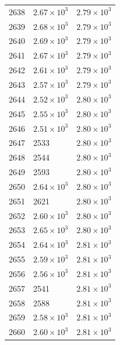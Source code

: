 \begin{table}[H]
\begin{tabular}{lll}
2638 & $\displaystyle 2.67 \times 10^{3}$ & $\displaystyle 2.79 \times 10^{3}$ \\
2639 & $\displaystyle 2.68 \times 10^{3}$ & $\displaystyle 2.79 \times 10^{3}$ \\
2640 & $\displaystyle 2.69 \times 10^{3}$ & $\displaystyle 2.79 \times 10^{3}$ \\
2641 & $\displaystyle 2.67 \times 10^{3}$ & $\displaystyle 2.79 \times 10^{3}$ \\
2642 & $\displaystyle 2.61 \times 10^{3}$ & $\displaystyle 2.79 \times 10^{3}$ \\
2643 & $\displaystyle 2.57 \times 10^{3}$ & $\displaystyle 2.79 \times 10^{3}$ \\
2644 & $\displaystyle 2.52 \times 10^{3}$ & $\displaystyle 2.80 \times 10^{3}$ \\
2645 & $\displaystyle 2.55 \times 10^{3}$ & $\displaystyle 2.80 \times 10^{3}$ \\
2646 & $\displaystyle 2.51 \times 10^{3}$ & $\displaystyle 2.80 \times 10^{3}$ \\
2647 & 2533 & $\displaystyle 2.80 \times 10^{3}$ \\
2648 & 2544 & $\displaystyle 2.80 \times 10^{3}$ \\
2649 & 2593 & $\displaystyle 2.80 \times 10^{3}$ \\
2650 & $\displaystyle 2.64 \times 10^{3}$ & $\displaystyle 2.80 \times 10^{3}$ \\
2651 & 2621 & $\displaystyle 2.80 \times 10^{3}$ \\
2652 & $\displaystyle 2.60 \times 10^{3}$ & $\displaystyle 2.80 \times 10^{3}$ \\
2653 & $\displaystyle 2.65 \times 10^{3}$ & $\displaystyle 2.80 \times 10^{3}$ \\
2654 & $\displaystyle 2.64 \times 10^{3}$ & $\displaystyle 2.81 \times 10^{3}$ \\
2655 & $\displaystyle 2.59 \times 10^{3}$ & $\displaystyle 2.81 \times 10^{3}$ \\
2656 & $\displaystyle 2.56 \times 10^{3}$ & $\displaystyle 2.81 \times 10^{3}$ \\
2657 & 2541 & $\displaystyle 2.81 \times 10^{3}$ \\
2658 & 2588 & $\displaystyle 2.81 \times 10^{3}$ \\
2659 & $\displaystyle 2.58 \times 10^{3}$ & $\displaystyle 2.81 \times 10^{3}$ \\
2660 & $\displaystyle 2.60 \times 10^{3}$ & $\displaystyle 2.81 \times 10^{3}$ \\

\end{tabular}
\end{table}
